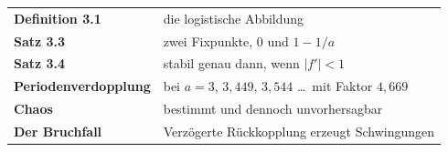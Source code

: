 \begin{merksatz}
\begin{center}
\renewcommand{\arraystretch}{1.5}
\begin{tabular}{@{}P{3.4cm}P{5.2cm}@{}}
\toprule
\textbf{Definition 3.1} & die logistische Abbildung\\
\textbf{Satz 3.3} & zwei Fixpunkte, $0$ und $1-1/a$\\
\textbf{Satz 3.4} & stabil genau dann, wenn $|f'| < 1$\\
\textbf{Perioden\-verdopplung} & bei $a=3$, $3{,}449$, $3{,}544$ \ldots\ mit Faktor $4{,}669$\\
\textbf{Chaos} & bestimmt und dennoch unvorhersagbar\\
\textbf{Der Bruchfall} & Verzögerte Rückkopplung erzeugt Schwingungen\\
\bottomrule
\end{tabular}
\end{center}

\begin{center}
\begin{minipage}{0.88\textwidth}
\end{minipage}
\end{center}
\end{merksatz}
